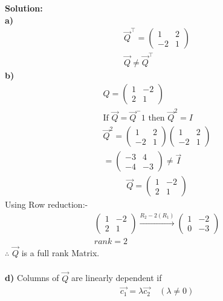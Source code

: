 \documentclass[journal]{IEEEtran}
\begin{document}
\textbf{Solution:}\\
    \textbf{a)}
    \begin{align}\vec{Q}^\top = \begin{pmatrix} 1 & 2 \\ -2 & 1 \end{pmatrix}\\
    \vec{Q} \neq \vec{Q}^\top
    \end{align}
    \textbf{b)}
    \begin{align}
    Q= \begin{pmatrix} 1 & -2 \\ 2 & 1 \end{pmatrix}\\
    \text{If } \vec{Q} = \vec{Q}^-1 \text{ then } \vec{Q}^2 = I\\
    \vec{Q}^2 = \begin{pmatrix} 1 & 2 \\ -2 & 1 \end{pmatrix} \begin{pmatrix} 1 & 2 \\ -2 & 1 \end{pmatrix}\\
    = \begin{pmatrix} -3 & 4 \\ -4 & -3 \end{pmatrix}
    \neq \vec{I}
    \end{align}
\begin{align}
\vec{Q}= \begin{pmatrix} 1 & -2 \\ 2 & 1 \end{pmatrix}
\end{align}
    Using Row reduction:-
\begin{align}
\begin{pmatrix} 1 & -2 \\ 2 & 1 \end{pmatrix}\xrightarrow{R_2-2(R_1)}
\begin{pmatrix} 1 & -2 \\ 0 & -3
\end{pmatrix}\\
rank=2
\end{align}
$\therefore$ $\vec{Q}$ is a full rank Matrix.\\\\
\textbf{d)}
Columns of $\vec{Q}$ are linearly dependent if
\begin{align}
\vec{c_1} = \lambda \vec{c_2} \quad (\lambda \neq 0)
\end{align}
\end{document}
